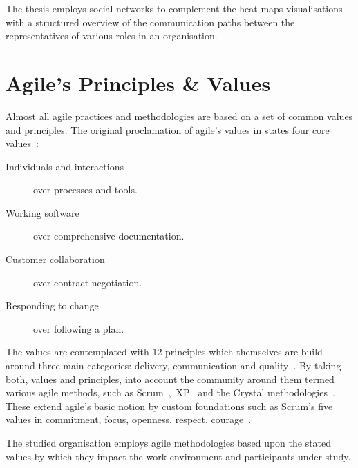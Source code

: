 The thesis employs social networks to complement the heat maps visualisations with a structured overview of the communication paths between the representatives of various roles in an organisation.

\section{Agile's Principles \& Values}

Almost all agile practices and methodologies are based on a set of common values and principles. The original proclamation of agile's values in  states four core values~\citep{beck2001agile}:

\begin{description}
  \item[Individuals and interactions] over processes and tools.
  \item[Working software] over comprehensive documentation.
  \item[Customer collaboration] over contract negotiation.
  \item[Responding to change] over following a plan.
\end{description}

The values are contemplated with 12 principles which themselves are build around three main categories: delivery, communication and quality~\citep{beck2001agile}. By taking both, values and principles, into account the community around them termed various agile methods, such as Scrum~\citep{sims2012scrum},~\ac{XP}~\citep{beck2004xp} and the Crystal methodologies~\citep{cockburn2004crystal}. These extend agile's basic notion by custom foundations such as Scrum's five values in commitment, focus, openness, respect, courage~\cite{schwaberagilescrum}.

The studied organisation employs agile methodologies based upon the stated values by which they impact the work environment and participants under study. 